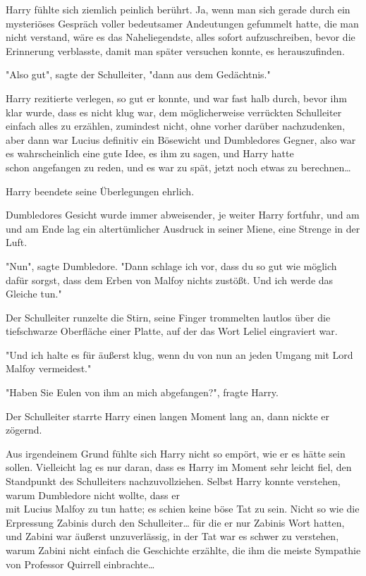 {Harry fühlte sich ziemlich peinlich berührt. Ja, wenn man sich gerade durch ein mysteriöses Gespräch voller bedeutsamer Andeutungen gefummelt hatte, die man nicht verstand, wäre es das Naheliegendste, alles sofort aufzuschreiben, bevor die Erinnerung verblasste, damit man später versuchen konnte, es herauszufinden.

"Also gut", sagte der Schulleiter, "dann aus dem Gedächtnis."

Harry rezitierte verlegen, so gut er konnte, und war fast halb durch, bevor ihm klar wurde, dass es nicht klug war, dem möglicherweise verrückten Schulleiter einfach alles zu erzählen, zumindest nicht, ohne vorher darüber nachzudenken, aber dann war Lucius definitiv ein Bösewicht und Dumbledores Gegner, also war es wahrscheinlich eine gute Idee, es ihm zu sagen, und Harry hatte\\ schon angefangen zu reden, und es war zu spät, jetzt noch etwas zu berechnen…

Harry beendete seine Überlegungen ehrlich.

Dumbledores Gesicht wurde immer abweisender, je weiter Harry fortfuhr, und am\\ und am Ende lag ein altertümlicher Ausdruck in seiner Miene, eine Strenge in der Luft.

"Nun", sagte Dumbledore. "Dann schlage ich vor, dass du so gut wie möglich dafür sorgst, dass dem Erben von Malfoy nichts zustößt. Und ich werde das Gleiche tun."

Der Schulleiter runzelte die Stirn, seine Finger trommelten lautlos über die tiefschwarze Oberfläche einer Platte, auf der das Wort Leliel eingraviert war.

"Und ich halte es für äußerst klug, wenn du von nun an jeden Umgang mit Lord Malfoy vermeidest."

"Haben Sie Eulen von ihm an mich abgefangen?", fragte Harry.

Der Schulleiter starrte Harry einen langen Moment lang an, dann nickte er zögernd.

Aus irgendeinem Grund fühlte sich Harry nicht so empört, wie er es hätte sein sollen. Vielleicht lag es nur daran, dass es Harry im Moment sehr leicht fiel, den Standpunkt des Schulleiters nachzuvollziehen. Selbst Harry konnte verstehen, warum Dumbledore nicht wollte, dass er\\ mit Lucius Malfoy zu tun hatte; es schien keine böse Tat zu sein. Nicht so wie die Erpressung Zabinis durch den Schulleiter… für die er nur Zabinis Wort hatten, und Zabini war äußerst unzuverlässig, in der Tat war es schwer zu verstehen, warum Zabini nicht einfach die Geschichte erzählte, die ihm die meiste Sympathie von Professor Quirrell einbrachte…

}
